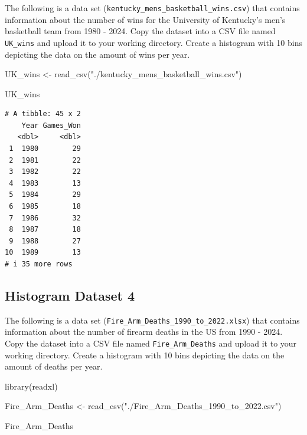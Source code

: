 \documentclass[
  letterpaper,
  DIV=11,
  numbers=noendperiod]{scrreprt}
\newenvironment{Shaded}{\begin{snugshade}}{\end{snugshade}}
\newcommand{\FunctionTok}[1]{\textcolor[rgb]{0.28,0.35,0.67}{#1}}
\newcommand{\NormalTok}[1]{\textcolor[rgb]{0.00,0.23,0.31}{#1}}
\newcommand{\OtherTok}[1]{\textcolor[rgb]{0.00,0.23,0.31}{#1}}
\newcommand{\StringTok}[1]{\textcolor[rgb]{0.13,0.47,0.30}{#1}}
\begin{document}
The following is a data set
(\texttt{kentucky\_mens\_basketball\_wins.csv}) that contains
information about the number of wins for the University of Kentucky's
men's basketball team from 1980 - 2024. Copy the dataset into a CSV file
named \texttt{UK\_wins} and upload it to your working directory. Create
a histogram with 10 bins depicting the data on the amount of wins per
year.

\begin{Shaded}
\begin{Highlighting}[]
\NormalTok{UK\_wins }\OtherTok{\textless{}{-}} \FunctionTok{read\_csv}\NormalTok{(}\StringTok{"./kentucky\_mens\_basketball\_wins.csv"}\NormalTok{)}

\NormalTok{UK\_wins}
\end{Highlighting}
\end{Shaded}

\begin{verbatim}
# A tibble: 45 x 2
    Year Games_Won
   <dbl>     <dbl>
 1  1980        29
 2  1981        22
 3  1982        22
 4  1983        13
 5  1984        29
 6  1985        18
 7  1986        32
 8  1987        18
 9  1988        27
10  1989        13
# i 35 more rows
\end{verbatim}

\subsection*{Histogram Dataset 4}\label{histogram-dataset-4}

The following is a data set
(\texttt{Fire\_Arm\_Deaths\_1990\_to\_2022.xlsx}) that contains
information about the number of firearm deaths in the US from 1990 -
2024. Copy the dataset into a CSV file named \texttt{Fire\_Arm\_Deaths}
and upload it to your working directory. Create a histogram with 10 bins
depicting the data on the amount of deaths per year.

\begin{Shaded}
\begin{Highlighting}[]
\FunctionTok{library}\NormalTok{(readxl)}

\NormalTok{Fire\_Arm\_Deaths }\OtherTok{\textless{}{-}} \FunctionTok{read\_csv}\NormalTok{(}\StringTok{"./Fire\_Arm\_Deaths\_1990\_to\_2022.csv"}\NormalTok{)}

\NormalTok{Fire\_Arm\_Deaths}
\end{Highlighting}
\end{Shaded}
\end{document}
